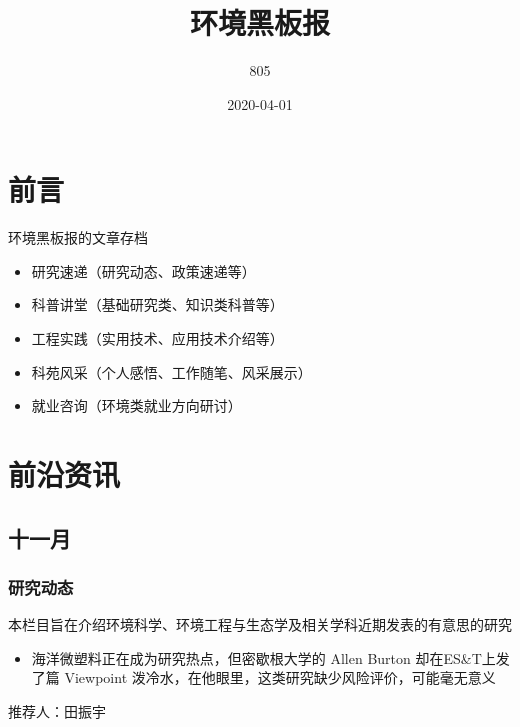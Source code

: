 \documentclass[]{book}
\title{环境黑板报}
\author{805}
\date{2020-04-01}
\providecommand{\tightlist}{%
  \setlength{\itemsep}{0pt}\setlength{\parskip}{0pt}}
\begin{document}
\maketitle

{
\setcounter{tocdepth}{1}
\tableofcontents
}
\hypertarget{ux524dux8a00}{%
\chapter{前言}\label{ux524dux8a00}}

环境黑板报的文章存档

\begin{itemize}
\item
  研究速递（研究动态、政策速递等）
\item
  科普讲堂（基础研究类、知识类科普等）
\item
  工程实践（实用技术、应用技术介绍等）
\item
  科苑风采（个人感悟、工作随笔、风采展示）
\item
  就业咨询（环境类就业方向研讨）
\end{itemize}

\hypertarget{ux524dux6cbfux8d44ux8baf}{%
\chapter{前沿资讯}\label{ux524dux6cbfux8d44ux8baf}}

\hypertarget{ux5341ux4e00ux6708}{%
\section*{十一月}\label{ux5341ux4e00ux6708}}

\hypertarget{ux7814ux7a76ux52a8ux6001}{%
\subsection*{研究动态}\label{ux7814ux7a76ux52a8ux6001}}

本栏目旨在介绍环境科学、环境工程与生态学及相关学科近期发表的有意思的研究

\begin{itemize}
\tightlist
\item
  海洋微塑料正在成为研究热点，但密歇根大学的 Allen Burton 却在ES\&T上发了篇 Viewpoint 泼冷水，在他眼里，这类研究缺少风险评价，可能毫无意义
\end{itemize}

推荐人：田振宇
\end{document}
